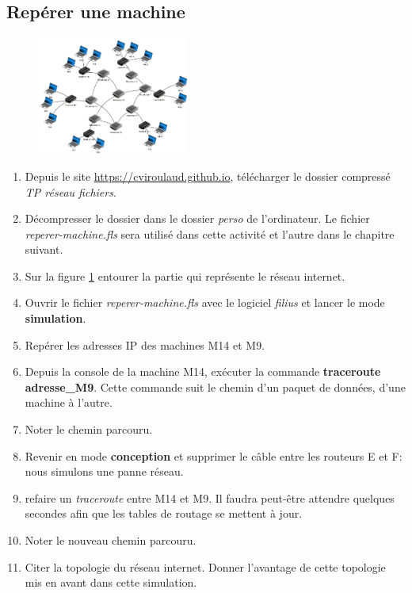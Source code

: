 \documentclass[a4paper,11pt]{article}
\begin{document}
\begin{Form}
\section{Repérer une machine}
\begin{figure}[!h]
\centering
\includegraphics[width=5cm]{ressources/routage.png}
\label{reseau}
\end{figure}
\begin{activite}
\begin{enumerate}
\item Depuis le site \url{https://cviroulaud.github.io}, télécharger le dossier compressé \emph{TP réseau fichiers}.
\item Décompresser le dossier dans le dossier \emph{perso} de l'ordinateur. Le fichier \emph{reperer-machine.fls} sera utilisé dans cette activité et l'autre dans le chapitre suivant.
\item Sur la figure \ref{reseau} entourer la partie qui représente le réseau internet.
\item Ouvrir le fichier \emph{reperer-machine.fls} avec le logiciel \emph{filius} et lancer le mode \textbf{simulation}.
\item Repérer les adresses IP des machines M14 et M9.
\item Depuis la console de la machine M14, exécuter la commande \textbf{traceroute adresse\_M9}. Cette commande suit le chemin d'un paquet de données, d'une machine à l'autre.
\item Noter le chemin parcouru.
\item Revenir en mode \textbf{conception} et supprimer le câble entre les routeurs E et F: nous simulons une panne réseau.
\item refaire un \emph{traceroute} entre M14 et M9. Il faudra peut-être attendre quelques secondes afin que les tables de routage se mettent à jour.
\item Noter le nouveau chemin parcouru.
\item Citer la topologie du réseau internet. Donner l'avantage de cette topologie mis en avant dans cette simulation.
\end{enumerate}
\end{activite}

\end{Form}
\end{document}
